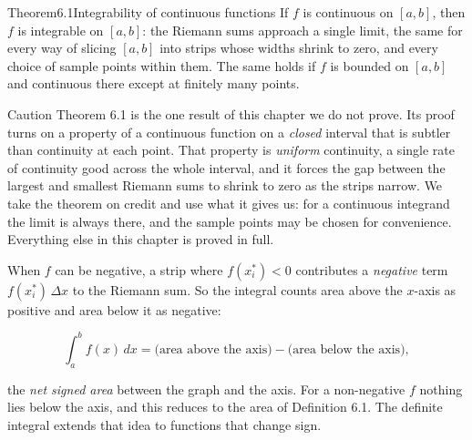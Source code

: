 \documentclass[a4paper,12pt,oneside]{memoir}
\begin{document}
\begin{envtheorem}{Theorem}{6.1}{Integrability of continuous functions}
If \(f\) is continuous on \([a, b]\), then \(f\) is integrable on \([a, b]\): the Riemann sums approach a single limit, the same for every way of slicing \([a, b]\) into strips whose widths shrink to zero, and every choice of sample points within them. The same holds if \(f\) is bounded on \([a, b]\) and continuous there except at finitely many points.
\end{envtheorem}
\begin{envcaution}{Caution}{}{}
Theorem 6.1 is the one result of this chapter we do not prove. Its proof turns on a property of a continuous function on a \emph{closed} interval that is subtler than continuity at each point. That property is \emph{uniform} continuity, a single rate of continuity good across the whole interval, and it forces the gap between the largest and smallest Riemann sums to shrink to zero as the strips narrow. We take the theorem on credit and use what it gives us: for a continuous integrand the limit is always there, and the sample points may be chosen for convenience. Everything else in this chapter is proved in full.
\end{envcaution}
When \(f\) can be negative, a strip where \(f(x_{i}^{*}) < 0\) contributes a \emph{negative} term \(f(x_{i}^{*})\,\Delta x\) to the Riemann sum. So the integral counts area above the \(x\)-axis as positive and area below it as negative:

\[ \int_{a}^{b} f(x)\,dx = \bigl(\text{area above the axis}\bigr) - \bigl(\text{area below the axis}\bigr), \]

the \emph{net signed area} between the graph and the axis. For a non-negative \(f\) nothing lies below the axis, and this reduces to the area of Definition 6.1. The definite integral extends that idea to functions that change sign.
\end{document}

